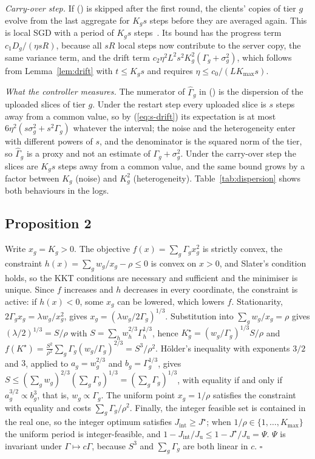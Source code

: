 \documentclass[journal]{IEEEtran}
\newcommand{\Gh}{\hat\Gamma}
\begin{document}
\emph{Carry-over step.} If () is skipped after the first round, the clients' copies of tier $g$ evolve from the last aggregate for $K_gs$ steps before they are averaged again. This is local SGD with a period of $K_gs$ steps~\cite{stich2019,wang2021coop}. Its bound has the progress term $c_1D_g/(\eta sR)$, because all $sR$ local steps now contribute to the server copy, the same variance term, and the drift term $c_2\eta^2L^2s^2K_g^2(\Gamma_g+\sigma_g^2)$, which follows from Lemma~\ref{lem:drift} with $t\le K_gs$ and requires $\eta\le c_0/(LK_{\max}s)$.

\emph{What the controller measures.} The numerator of $\Gh_g$ in () is the dispersion of the uploaded slices of tier $g$. Under the restart step every uploaded slice is $s$ steps away from a common value, so by (\ref{eq:s-drift}) its expectation is at most $6\eta^2(s\sigma_g^2+s^2\Gamma_g)$ whatever the interval; the noise and the heterogeneity enter with different powers of $s$, and the denominator is the squared norm of the tier, so $\Gh_g$ is a proxy and not an estimate of $\Gamma_g+\sigma_g^2$. Under the carry-over step the slices are $K_gs$ steps away from a common value, and the same bound grows by a factor between $K_g$ (noise) and $K_g^2$ (heterogeneity). Table~\ref{tab:dispersion} shows both behaviours in the logs.

\subsection{Proposition 2}
\label{supp:cuberoot}
Write $x_g=K_g>0$. The objective $f(x)=\sum_g\Gamma_gx_g^2$ is strictly convex, the constraint $h(x)=\sum_gw_g/x_g-\rho\le0$ is convex on $x>0$, and Slater's condition holds, so the KKT conditions are necessary and sufficient and the minimiser is unique. Since $f$ increases and $h$ decreases in every coordinate, the constraint is active: if $h(x)<0$, some $x_g$ can be lowered, which lowers $f$. Stationarity, $2\Gamma_gx_g=\lambda w_g/x_g^2$, gives $x_g=(\lambda w_g/2\Gamma_g)^{1/3}$. Substitution into $\sum_gw_g/x_g=\rho$ gives $(\lambda/2)^{1/3}=S/\rho$ with $S=\sum_hw_h^{2/3}\Gamma_h^{1/3}$, hence $K_g^\star=(w_g/\Gamma_g)^{1/3}S/\rho$ and $f(K^\star)=\frac{S^2}{\rho^2}\sum_g\Gamma_g(w_g/\Gamma_g)^{2/3}=S^3/\rho^2$. H\"older's inequality with exponents $3/2$ and $3$, applied to $a_g=w_g^{2/3}$ and $b_g=\Gamma_g^{1/3}$, gives $S\le(\sum_gw_g)^{2/3}(\sum_g\Gamma_g)^{1/3}=(\sum_g\Gamma_g)^{1/3}$, with equality if and only if $a_g^{3/2}\propto b_g^{3}$, that is, $w_g\propto\Gamma_g$. The uniform point $x_g=1/\rho$ satisfies the constraint with equality and costs $\sum_g\Gamma_g/\rho^2$. Finally, the integer feasible set is contained in the real one, so the integer optimum satisfies $J_{\mathrm{int}}\ge J^\star$; when $1/\rho\in\{1,\dots,K_{\max}\}$ the uniform period is integer-feasible, and $1-J_{\mathrm{int}}/J_{\mathrm u}\le1-J^\star/J_{\mathrm u}=\Psi$. $\Psi$ is invariant under $\Gamma\mapsto c\Gamma$, because $S^3$ and $\sum_g\Gamma_g$ are both linear in $c$. \hfill$\square$
\end{document}
